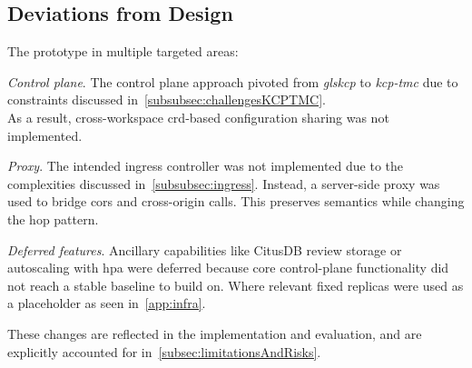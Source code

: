 \documentclass[11pt, a4paper, oneside, listof=totoc]{scrartcl}
\begin{document}
        \subsection{Deviations from Design}\label{subsec:deviationsFromDesign}
            The prototype in multiple targeted areas:
            \begin{enumerate}[label={[\arabic*]:},
                    ref=Challenge~\arabic*,
                    leftmargin=*,
                    itemsep=0.6\baselineskip]

                    \item\label{chal:controlPlane}
                        \textit{Control plane}.
                        The control plane approach pivoted from \emph{gls{kcp}} to
                        \emph{\gls{kcp}-\gls{tmc}} due to constraints discussed
                        in~\autoref{subsubsec:challengesKCPTMC}.\\
                        As a result, cross-workspace \gls{crd}-based configuration sharing was not
                        implemented.

                    \item\label{chal:proxy}
                        \textit{Proxy}.
                        The intended \gls{ingress} controller was not implemented due to the
                        complexities discussed in~\autoref{subsubsec:ingress}.
                        Instead, a server-side proxy was used to bridge \gls{cors} and
                        cross-origin calls.
                        This preserves semantics while changing the hop pattern.

                    \item\label{chal:deferredFeatures}
                        \textit{Deferred features}.
                        Ancillary capabilities like CitusDB review storage or autoscaling with
                        \gls{hpa} were deferred because core control-plane functionality did not
                        reach a stable baseline to build on.
                        Where relevant fixed replicas were used as a placeholder as seen
                        in~\autoref{app:infra}.

            \end{enumerate}
            These changes are reflected in the implementation and evaluation, and are explicitly
            accounted for in~\autoref{subsec:limitationsAndRisks}.
\end{document}
